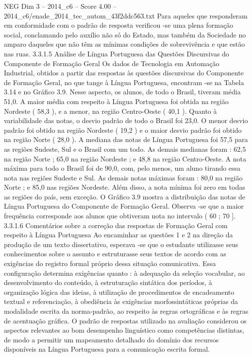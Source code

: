 \begin{textsample}{NEG Dim 3 – 2014\_c6 – Score 4.00 – 2014\_c6/enade\_2014\_tec\_autom\_43f2ddc563.txt}
Para aqueles que responderam em conformidade com o padrão de resposta verificou -se uma plena formação social, conclamando pelo auxílio não só do Estado, mas também da Sociedade no amparo daqueles que não têm as mínimas condições de sobrevivência e que estão nas ruas. 3.3.1.5 Análise de Língua Portuguesa das Questões Discursivas do Componente de Formação Geral Os dados de Tecnologia em Automação Industrial, obtidos a partir das respostas às questões discursivas do Componente de Formação Geral, no que tange à Língua Portuguesa, encontram -se na Tabela 3.14 e no Gráfico 3.9.
Nesse aspecto, os alunos, de todo o Brasil, tiveram média 51,0.
A maior média com respeito à Língua Portuguesa foi obtida na região Nordeste ( 58,3 ), e a menor, na região Centro-Oeste ( 40,1 ).
Quanto à variabilidade das notas, o desvio padrão de todo o Brasil foi 23,0.
O menor desvio padrão foi obtido na região Nordeste ( 19,2 ) e o maior desvio padrão foi obtido na região Norte ( 28,0 ).
A mediana das notas de Língua Portuguesa foi 57,5 para as regiões Sudeste, Sul e o Brasil com um todo.
As demais medianas foram : 62,5 na região Norte ; 65,0 na região Nordeste ; e 48,8 na região Centro-Oeste.
A nota máxima para todo o Brasil foi de 90,0, com, pelo menos, um aluno tirando essa nota nas regiões Sudeste e Sul.
As demais notas máximas foram : 80,0 na região Norte ; e 85,0 nas regiões Nordeste.
Além disso, a nota mínima foi zero em todas as regiões do país, sem exceção.
O Gráfico 3.9 mostra a distribuição das notas de Língua Portuguesa do Componente de Formação Geral.
Observa -se que a maior frequência corresponde aos alunos que obtiveram nota no intervalo ( 60 ; 70 ]. 3.3.1.6 Comentários sobre a correção das respostas de Formação Geral com respeito à Língua Portuguesa Ao encaminhar as questões 1 e 2 na direção da produção de um texto dissertativo, esperava -se que o estudante utilizasse seus conhecimentos sobre o assunto e estruturasse seus textos de acordo com as exigências do registro formal próprio dessa situação comunicativa.
Essa configuração determina exigências quanto : à adequação da seleção vocabular, ao desenvolvimento do conteúdo, à estruturação sintática dos períodos, à organização lógica das ideias, à utilização de procedimentos de encadeamento textual e referenciação, à obediência às exigências morfossintáticas próprias da modalidade escrita da norma-padrão, ao respeito às regras ortográficas e às regras de acentuação gráfica.
O padrão de respostas utilizado na avaliação considerou os aspectos relevantes ao bom desempenho linguístico como competências distintas, de modo a permitir um mapeamento detalhado do domínio dos recursos disponíveis na Língua Portuguesa para a comunicação escrita formal.

\end{textsample}
